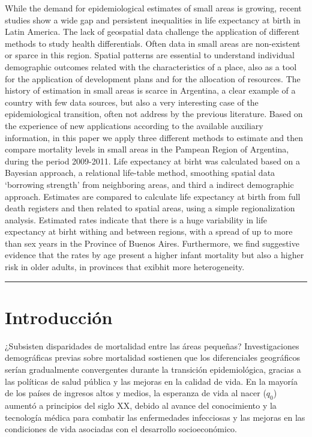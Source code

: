 \documentclass[12pt,]{article}
\begin{document}
While the demand for epidemiological estimates of small areas is
growing, recent studies show a wide gap and persistent inequalities in
life expectancy at birth in Latin America. The lack of geospatial data
challenge the application of different methods to study health
differentials. Often data in small areas are non-existent or sparce in
this region. Spatial patterns are essential to understand individual
demographic outcomes related with the characteristics of a place, also
as a tool for the application of development plans and for the
allocation of resources. The history of estimation in small areas is
scarce in Argentina, a clear example of a country with few data sources,
but also a very interesting case of the epidemiological transition,
often not address by the previous literature. Based on the experience of
new applications according to the available auxiliary information, in
this paper we apply three different methods to estimate and then compare
mortality levels in small areas in the Pampean Region of Argentina,
during the period 2009-2011. Life expectancy at birht was calculated
based on a Bayesian approach, a relational life-table method, smoothing
spatial data `borrowing strength' from neighboring areas, and third a
indirect demographic approach. Estimates are compared to calculate life
expectancy at birth from full death registers and then related to
spatial areas, using a simple regionalization analysis. Estimated rates
indicate that there is a huge variability in life expectancy at birht
withing and between regions, with a spread of up to more than sex years
in the Province of Buenos Aires. Furthermore, we find suggestive
evidence that the rates by age present a higher infant mortality but
also a higher risk in older adults, in provinces that exibhit more
heterogeneity.

\begin{center}\rule{0.5\linewidth}{0.5pt}\end{center}

\hypertarget{introducciuxf3n}{%
\section{\texorpdfstring{\textbf{Introducción}}{Introducción}}\label{introducciuxf3n}}

¿Subsisten disparidades de mortalidad entre las áreas pequeñas?
Investigaciones demográficas previas sobre mortalidad sostienen que los
diferenciales geográficos serían gradualmente convergentes durante la
transición epidemiológica, gracias a las políticas de salud pública y
las mejoras en la calidad de vida. En la mayoría de los países de
ingresos altos y medios, la esperanza de vida al nacer (\(q_0\)) aumentó
a principios del siglo XX, debido al avance del conocimiento y la
tecnología médica para combatir las enfermedades infecciosas y las
mejoras en las condiciones de vida asociadas con el desarrollo
socioeconómico.
\end{document}
